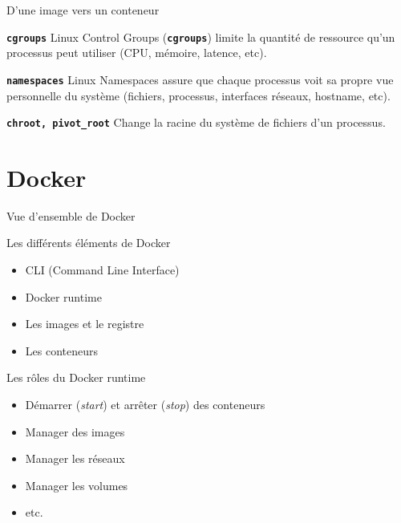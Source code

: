 \documentclass[aspectratio=169,10pt]{beamer}
\begin{document}
\begin{frame}{D'une image vers un conteneur}


\begin{block}{\texttt{\textbf{cgroups}}}
Linux Control Groups (\texttt{\textbf{cgroups}}) limite la quantité de ressource qu'un processus peut utiliser (CPU, mémoire, latence, etc).
\end{block}

\begin{block}{\texttt{\textbf{namespaces}}}
Linux Namespaces assure que chaque processus voit sa propre vue personnelle du système (fichiers, processus, interfaces réseaux, hostname, etc).
\end{block}

\begin{block}{\texttt{\textbf{chroot, pivot_root}}}
Change la racine du système de fichiers d'un processus.   
\end{block}

\end{frame}

\section{Docker}

\begin{frame}{Vue d'ensemble de Docker}

Les différents éléments de Docker

\begin{itemize}
    \item CLI (Command Line Interface)
    \item Docker runtime
    \item Les images et le registre
    \item Les conteneurs
\end{itemize}

\begin{alertblock}{Les rôles du Docker runtime}
    \begin{itemize}
    \item Démarrer (\emph{start}) et arrêter (\emph{stop}) des conteneurs 
    \item Manager des images
    \item Manager les réseaux
    \item Manager les volumes
    \item etc.
\end{itemize}
\end{alertblock}

\end{frame}
\end{document}

